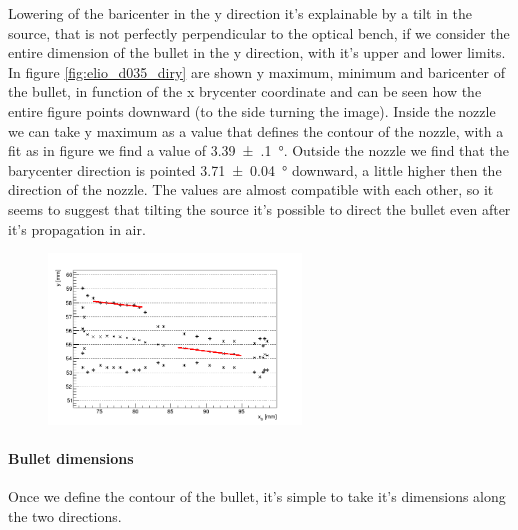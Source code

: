Lowering of the baricenter in the y direction it's explainable by a tilt in the source, that is not perfectly perpendicular to the optical bench, if we consider the entire dimension of the bullet in the y direction, with it's upper and lower limits. In figure \ref{fig:elio_d035_diry} are shown y maximum, minimum and baricenter of the bullet, in function of the x brycenter coordinate and can be seen how the entire figure points downward (to the side turning the image). Inside the nozzle we can take y maximum as a value that defines the contour of the nozzle, with a fit as in figure we find a value of \SI{3.39(10)}{\degree}. Outside the nozzle we find that the barycenter direction is pointed \SI{3.71(4)}{\degree} downward, a little higher then the direction of the nozzle. The values are almost compatible with each other, so it seems to suggest that tilting the source it's possible to direct the bullet even after it's propagation in air.
\begin{figure}
 \centering
 \includegraphics[width=0.6\textwidth]{Images/Shape/elio_d035_incl.png}
\end{figure}


\paragraph{Bullet dimensions}
Once we define the contour of the bullet, it's simple to take it's dimensions along the two directions.


